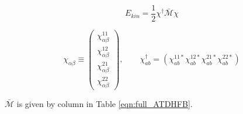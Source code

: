 \begin{equation}\label{eqn:kinetic_energy}
E_{kin} = \frac{1}{2}\chi^\dagger\mathcal{\bar{M}}\chi
\end{equation}


\begin{equation}
\chi_{\alpha\beta} \equiv \left(\begin{array}{c}
\chi_{\alpha\beta}^{11}\\
\chi_{\alpha\beta}^{12}\\
\chi_{\alpha\beta}^{21}\\
\chi_{\alpha\beta}^{22}
\end{array}\right), \qquad
\chi^\dagger_{ab} = \left(
\chi_{ab}^{11*} 
\chi_{ab}^{12*} 
\chi_{ab}^{21*} 
\chi_{ab}^{22*} 
\right)
\end{equation}

$\mathcal{\bar{M}}$ is given by column in Table \eqref{eqn:full_ATDHFB}.

